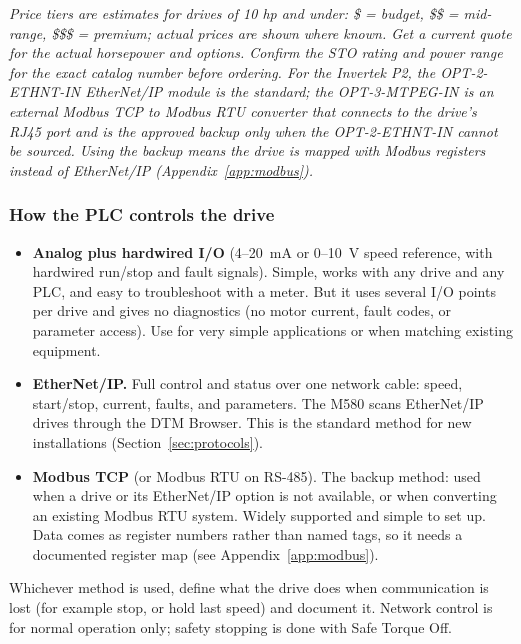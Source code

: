 \textit{\small Price tiers are estimates for drives of 10 hp and under: \$ = budget, \$\$ = mid-range, \$\$\$ = premium; actual prices are shown where known. Get a current quote for the actual horsepower and options. Confirm the STO rating and power range for the exact catalog number before ordering. For the Invertek P2, the OPT-2-ETHNT-IN EtherNet/IP module is the standard; the OPT-3-MTPEG-IN is an external Modbus TCP to Modbus RTU converter that connects to the drive's RJ45 port and is the approved backup only when the OPT-2-ETHNT-IN cannot be sourced. Using the backup means the drive is mapped with Modbus registers instead of EtherNet/IP (Appendix~\ref{app:modbus}).}

\subsubsection*{How the PLC controls the drive}
\begin{itemize}[itemsep=2pt]
  \item \textbf{Analog plus hardwired I/O} (4--20~mA or 0--10~V speed reference, with hardwired run/stop and fault signals). Simple, works with any drive and any PLC, and easy to troubleshoot with a meter. But it uses several I/O points per drive and gives no diagnostics (no motor current, fault codes, or parameter access). Use for very simple applications or when matching existing equipment.
  \item \textbf{EtherNet/IP.} Full control and status over one network cable: speed, start/stop, current, faults, and parameters. The M580 scans EtherNet/IP drives through the DTM Browser. This is the standard method for new installations (Section~\ref{sec:protocols}).
  \item \textbf{Modbus TCP} (or Modbus RTU on RS-485). The backup method: used when a drive or its EtherNet/IP option is not available, or when converting an existing Modbus RTU system. Widely supported and simple to set up. Data comes as register numbers rather than named tags, so it needs a documented register map (see Appendix~\ref{app:modbus}).
\end{itemize}
Whichever method is used, define what the drive does when communication is lost (for example stop, or hold last speed) and document it. Network control is for normal operation only; safety stopping is done with Safe Torque Off.

